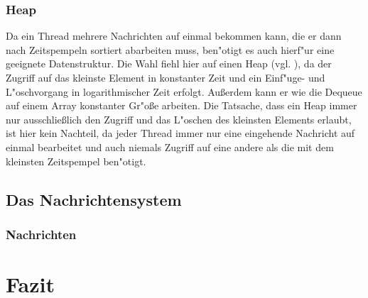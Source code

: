 \documentclass{scrreprt}
\begin{document}
\subsection{Heap}
Da ein Thread mehrere Nachrichten auf einmal bekommen kann, die er dann nach Zeitspempeln sortiert abarbeiten muss,
ben"otigt es auch hierf"ur eine geeignete Datenstruktur. Die Wahl fiehl hier auf einen Heap (vgl. \cite{...}), da der
Zugriff auf das kleinste Element in konstanter Zeit und ein Einf"uge- und L"oschvorgang in logarithmischer Zeit erfolgt.
Au\ss erdem kann er wie die Dequeue auf einem Array konstanter Gr"o\ss e arbeiten.
Die Tatsache, dass ein Heap immer nur ausschlie\ss lich den Zugriff und das L"oschen des kleinsten Elements erlaubt, ist
hier kein Nachteil, da jeder Thread immer nur eine eingehende Nachricht auf einmal bearbeitet und auch niemals Zugriff auf eine
andere als die mit dem kleinsten Zeitspempel ben"otigt.

\section{Das Nachrichtensystem}
\subsection{Nachrichten}


\chapter{Fazit}
\end{document}
